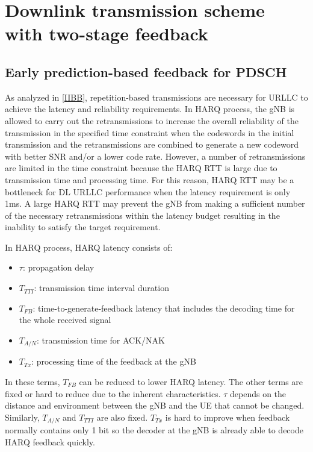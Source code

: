 \documentclass[conference]{IEEEtran}
\begin{document}
\section{Downlink transmission scheme with two-stage feedback}
\subsection{Early prediction-based feedback for PDSCH}\label{AA}
As analyzed in \ref{IIBB}, repetition-based transmissions are necessary for URLLC to achieve the latency and reliability requirements. In HARQ process, the gNB is allowed to carry out the retransmissions to increase the overall reliability of the transmission in the specified time constraint when the codewords in the initial transmission and the retransmissions are combined to generate a new codeword with better SNR and/or a lower code rate.  However, a number of retransmissions are limited in the time constraint because the HARQ RTT is large due to transmission time and processing time. For this reason, HARQ RTT may be a bottleneck for DL URLLC performance when the latency requirement is only 1ms. A large HARQ RTT may prevent the gNB from making a sufficient number of the necessary retransmissions within the latency budget resulting in the inability to satisfy the target requirement. 

In HARQ process, HARQ latency consists of:

\begin{itemize}
    \item $\tau$: propagation delay
    \item $T_{TTI}$: transmission time interval duration
    \item $T_{FB}$: time-to-generate-feedback latency that includes the decoding time for the whole received signal
    \item $T_{A/N}$: transmission time for ACK/NAK
    \item $T_{Tx}$: processing time of the feedback at the gNB
\end{itemize}

In these terms, $T_{FB}$ can be reduced to lower HARQ latency. The other terms are fixed or hard to reduce due to the inherent characteristics. $\tau$ depends on the distance and environment between the gNB and the UE that cannot be changed. Similarly, $T_{A/N}$ and $T_{TTI}$ are also fixed. $T_{Tx}$ is hard to improve when feedback normally contains only 1 bit so the decoder at the gNB is already able to decode HARQ feedback quickly. 
\end{document}
